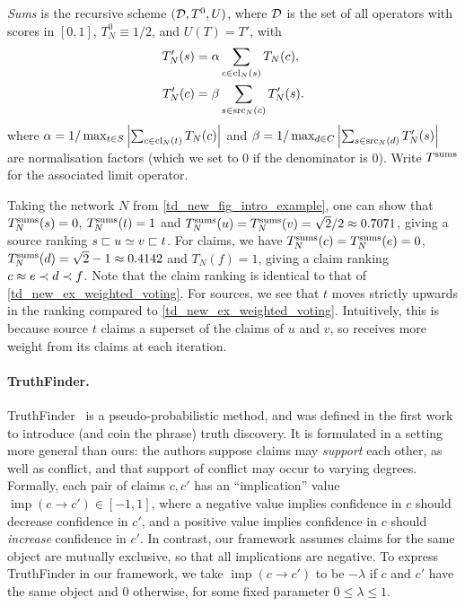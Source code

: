 \begin{definition}
    \label{td_new_def_sums}
    \emph{Sums} is the recursive scheme $(\mathcal{D}, T^0, U)$, where $\mathcal{D}$ is the set
    of all operators with scores in $[0, 1]$, $T^0_N \equiv 1 / 2$, and $U(T) =
    T'$, with
    \begin{align*}
        T'_N(s) &=
            \alpha
            \sum_{c \in \operatorname{cl}_N(s)}{
                T_N(c)
            },
        \\
        T'_N(c) &=
            \beta
            \sum_{s \in \operatorname{src}_N(c)}{
                T'_N(s)
            }.
    \end{align*}
    where $
        \alpha = 1 / \max_{t \in S}{
            \left|
                \sum_{c \in \operatorname{cl}_N(t)}{
                    T_N(c)
                }
            \right|
        }
    $ and $
        \beta = 1 / \max_{d \in C}{
            \left|
                \sum_{s \in \operatorname{src}_N(d)}{
                    T'_N(s)
                }
            \right|
        }
    $ are normalisation factors (which we set to 0 if the denominator is 0).
    Write $T^{\operatorname{sums}}$ for the associated limit operator.
\end{definition}

Taking the network $N$ from \cref{td_new_fig_intro_example}, one can show that
$T^{\operatorname{sums}}_N(s) = 0$, $T^{\operatorname{sums}}_N(t) = 1$ and $T^{\operatorname{sums}}_N(u) = T^{\operatorname{sums}}_N(v) = \sqrt{2} / 2
\approx 0.7071$, giving a source ranking $s \sqsubset u \simeq v \sqsubset t$.  For claims,
we have $T^{\operatorname{sums}}_N(c) = T^{\operatorname{sums}}_N(e) = 0$, $T^{\operatorname{sums}}_N(d) = \sqrt{2} - 1 \approx
0.4142$ and $T_N(f) = 1$, giving a claim ranking $c \approx e \prec d \prec f$. Note
that the claim ranking is identical to that of
\cref{td_new_ex_weighted_voting}. For sources, we see that $t$ moves strictly
upwards in the ranking compared to \cref{td_new_ex_weighted_voting}.
Intuitively, this is because source $t$ claims a superset of the claims of $u$
and $v$, so receives more weight from its claims at each iteration.

\paragraph{TruthFinder.} TruthFinder~\cite{yin2008} is a pseudo-probabilistic
method, and was defined in the first work to introduce (and coin the phrase)
truth discovery. It is formulated in a setting more general than ours: the
authors suppose claims may \emph{support} each other, as well as conflict, and
that support of conflict may occur to varying degrees. Formally, each pair of
claims $c, c'$ has an ``implication'' value $\operatorname{imp}(c \to c') \in
[-1, 1]$, where a negative value implies confidence in $c$ should decrease
confidence in $c'$, and a positive value implies confidence in $c$ should
\emph{increase} confidence in $c'$. In contrast, our framework assumes claims
for the same object are mutually exclusive, so that all implications are
negative. To express TruthFinder in our framework, we take
$\operatorname{imp}(c \to c')$ to be $-\lambda$ if $c$ and $c'$ have the same
object and $0$ otherwise, for some fixed parameter $0 \le \lambda \le 1$.

